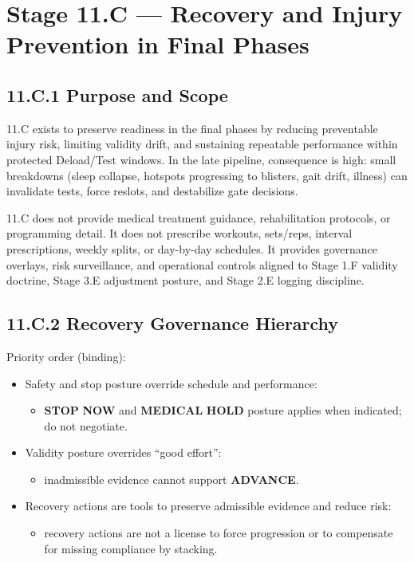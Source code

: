 \documentclass[10pt]{article}
\begin{document}
\section*{Stage 11.C — Recovery and Injury Prevention in Final Phases}
{}

\subsection*{11.C.1 Purpose and Scope}
{}

11.C exists to preserve readiness in the final phases by reducing preventable injury risk, limiting validity drift, and sustaining repeatable performance within protected Deload/Test windows. In the late pipeline, consequence is high: small breakdowns (sleep collapse, hotspots progressing to blisters, gait drift, illness) can invalidate tests, force reslots, and destabilize gate decisions.

11.C does not provide medical treatment guidance, rehabilitation protocols, or programming detail. It does not prescribe workouts, sets/reps, interval prescriptions, weekly splits, or day-by-day schedules. It provides governance overlays, risk surveillance, and operational controls aligned to Stage 1.F validity doctrine, Stage 3.E adjustment posture, and Stage 2.E logging discipline.

\newpage

\subsection*{11.C.2 Recovery Governance Hierarchy}
{}

Priority order (binding):

\begin{itemize}
\item Safety and stop posture override schedule and performance:
\begin{itemize}
\item \textbf{STOP} \textbf{NOW} and \textbf{MEDICAL} \textbf{HOLD} posture applies when indicated; do not negotiate.
\end{itemize}
\item Validity posture overrides “good effort”:
\begin{itemize}
\item inadmissible evidence cannot support \textbf{ADVANCE}.
\end{itemize}
\item Recovery actions are tools to preserve admissible evidence and reduce risk:
\begin{itemize}
\item recovery actions are not a license to force progression or to compensate for missing compliance by stacking.
\end{itemize}
\end{itemize}
\end{document}
